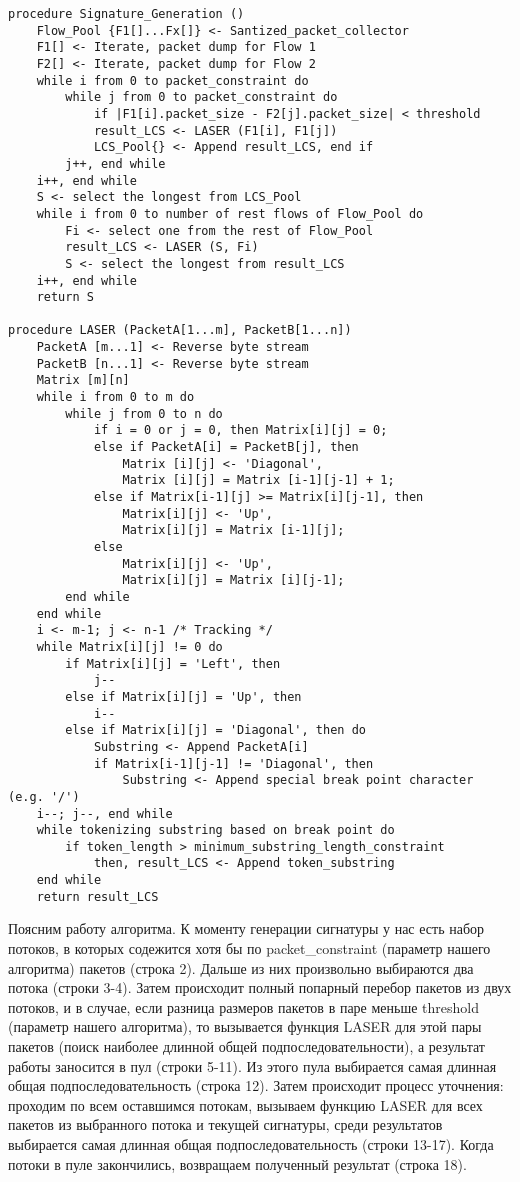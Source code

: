 \begin{lstlisting}[language=PL/I, caption=Алгоритм LASER]
procedure Signature_Generation ()
    Flow_Pool {F1[]...Fx[]} <- Santized_packet_collector
    F1[] <- Iterate, packet dump for Flow 1
    F2[] <- Iterate, packet dump for Flow 2
    while i from 0 to packet_constraint do
        while j from 0 to packet_constraint do
            if |F1[i].packet_size - F2[j].packet_size| < threshold
            result_LCS <- LASER (F1[i], F1[j])
            LCS_Pool{} <- Append result_LCS, end if
        j++, end while
    i++, end while
    S <- select the longest from LCS_Pool
    while i from 0 to number of rest flows of Flow_Pool do
        Fi <- select one from the rest of Flow_Pool
        result_LCS <- LASER (S, Fi)
        S <- select the longest from result_LCS
    i++, end while
    return S

procedure LASER (PacketA[1...m], PacketB[1...n])
    PacketA [m...1] <- Reverse byte stream
    PacketB [n...1] <- Reverse byte stream
    Matrix [m][n]
    while i from 0 to m do
        while j from 0 to n do
            if i = 0 or j = 0, then Matrix[i][j] = 0;
            else if PacketA[i] = PacketB[j], then
                Matrix [i][j] <- 'Diagonal',
                Matrix [i][j] = Matrix [i-1][j-1] + 1;
            else if Matrix[i-1][j] >= Matrix[i][j-1], then
                Matrix[i][j] <- 'Up',
                Matrix[i][j] = Matrix [i-1][j];
            else
                Matrix[i][j] <- 'Up',
                Matrix[i][j] = Matrix [i][j-1];
        end while
    end while
    i <- m-1; j <- n-1 /* Tracking */
    while Matrix[i][j] != 0 do
        if Matrix[i][j] = 'Left', then
            j--
        else if Matrix[i][j] = 'Up', then
            i--
        else if Matrix[i][j] = 'Diagonal', then do
            Substring <- Append PacketA[i]
            if Matrix[i-1][j-1] != 'Diagonal', then
                Substring <- Append special break point character (e.g. '/')
    i--; j--, end while
    while tokenizing substring based on break point do
        if token_length > minimum_substring_length_constraint
            then, result_LCS <- Append token_substring
    end while
    return result_LCS
\end{lstlisting}

Поясним работу алгоритма. К моменту генерации сигнатуры у нас есть набор потоков,
в которых содежится хотя бы по packet\_constraint (параметр нашего алгоритма) пакетов (строка 2).
Дальше из них произвольно выбираются два потока (строки 3-4). Затем происходит полный попарный перебор пакетов из двух потоков,
и в случае, если разница размеров пакетов в паре меньше threshold (параметр нашего алгоритма),
то вызывается функция LASER для этой пары пакетов (поиск наиболее длинной общей подпоследовательности),
а результат работы заносится в пул (строки 5-11).
Из этого пула выбирается самая длинная общая подпоследовательность (строка 12).
Затем происходит процесс уточнения: проходим по всем оставшимся потокам, вызываем функцию LASER для всех пакетов из выбранного потока и текущей сигнатуры,
среди результатов выбирается самая длинная общая подпоследовательность (строки 13-17). Когда потоки в пуле закончились, возвращаем полученный результат (строка 18).

